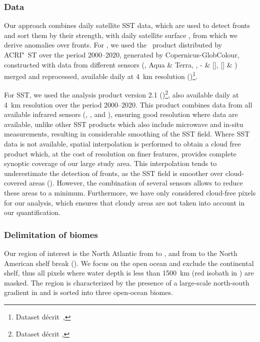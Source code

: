 \subsubsection{Data}

Our approach combines daily satellite SST data, which are used to detect fronts and sort them by their strength, with daily satellite surface , from which we derive anomalies over fronts.
For , we used the ~product distributed by ACRI"~ST over the period 2000--2020, generated by Copernicus-GlobColour, constructed with data from different sensors (,  Aqua \& Terra, , - \& [], [] \& ) merged and reprocessed, available daily at \qty{4}{\km} resolution (\cite{garnesson_2019})\footnote{Dataset  décrit~, }.

For SST, we used the    analysis product version 2.1 (\cite{merchant_2019, good_2020})\footnote{Dataset  décrit , }, also available daily at \qty{4}{\km} resolution over the period 2000--2020.
This product combines data from all available infrared sensors (, , and ), ensuring good resolution where data are available, unlike other SST products which also include microwave and in-situ measurements, resulting in considerable smoothing of the SST field. %
Where SST data is not available, spatial interpolation is performed to obtain a cloud free product which, at the cost of resolution on finer features, provides complete synoptic coverage of our large study area.
This interpolation tends to underestimate the detection of fronts, as the SST field is smoother over cloud-covered areas (\cite{merchant_2019}).
However, the combination of several sensors allows to reduce these areas to a minimum.
Furthermore, we have only considered cloud-free pixels for our analysis, which ensures that cloudy areas are not taken into account in our quantification.


\subsubsection{Delimitation of biomes}

Our region of interest is the North Atlantic from  to , and from  to the North American shelf break ().
We focus on the open ocean and exclude the continental shelf, thus all pixels where water depth is less than \qty{1500}{\km} (red isobath in ) are masked.
The region is characterized by the presence of a large-scale north-south gradient in  and is sorted into three open-ocean biomes.

